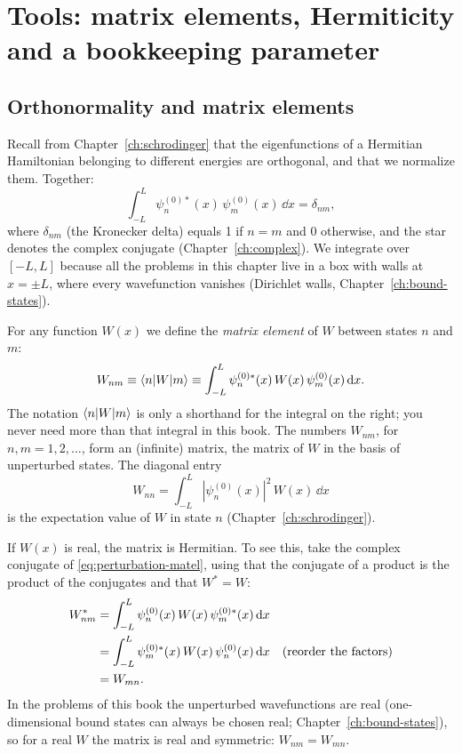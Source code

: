 \section{Tools: matrix elements, Hermiticity and a bookkeeping parameter}\label{sec:perturbation-tools}

\subsection{Orthonormality and matrix elements}

Recall from Chapter~\ref{ch:schrodinger} that the eigenfunctions of a Hermitian Hamiltonian belonging to different energies are orthogonal, and that we normalize them. Together:
\begin{equation}
\int_{-L}^{L}\psi_n^{(0)*}(x)\,\psi_m^{(0)}(x)\,\dd x=\delta_{nm},
\label{eq:perturbation-orthonormal}
\end{equation}
where $\delta_{nm}$ (the Kronecker delta) equals 1 if $n=m$ and 0 otherwise, and the star denotes the complex conjugate (Chapter~\ref{ch:complex}). We integrate over $[-L,L]$ because all the problems in this chapter live in a box with walls at $x=\pm L$, where every wavefunction vanishes (Dirichlet walls, Chapter~\ref{ch:bound-states}).

For any function $W(x)$ we define the \emph{matrix element} of $W$ between states $n$ and $m$:
\begin{equation}
W_{nm}\equiv\langle n|W|m\rangle\equiv\int_{-L}^{L}\psi_n^{(0)*}(x)\,W(x)\,\psi_m^{(0)}(x)\,\mathrm{d} x .
\label{eq:perturbation-matel}
\end{equation}
The notation $\langle n|W|m\rangle$ is only a shorthand for the integral on the right; you never need more than that integral in this book. The numbers $W_{nm}$, for $n,m=1,2,\dots$, form an (infinite) matrix, the matrix of $W$ in the basis of unperturbed states. The diagonal entry
\[
W_{nn}=\int_{-L}^{L}|\psi_n^{(0)}(x)|^2\,W(x)\,\dd x
\]
is the expectation value of $W$ in state $n$ (Chapter~\ref{ch:schrodinger}).

If $W(x)$ is real, the matrix is Hermitian. To see this, take the complex conjugate of \cref{eq:perturbation-matel}, using that the conjugate of a product is the product of the conjugates and that $W^*=W$:
\begin{align}
W_{nm}^* &= \int_{-L}^{L}\psi_n^{(0)}(x)\,W(x)\,\psi_m^{(0)*}(x)\,\mathrm{d} x \notag\\
&=\int_{-L}^{L}\psi_m^{(0)*}(x)\,W(x)\,\psi_n^{(0)}(x)\,\mathrm{d} x \quad\text{(reorder the factors)}\notag\\
&= W_{mn}. \label{eq:perturbation-hermmat}
\end{align}
In the problems of this book the unperturbed wavefunctions are real (one-dimensional bound states can always be chosen real; Chapter~\ref{ch:bound-states}), so for a real $W$ the matrix is real and symmetric: $W_{nm}=W_{mn}$.

